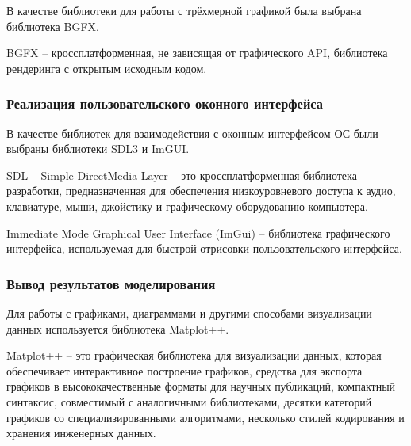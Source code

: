 В качестве библиотеки для работы с трёхмерной графикой была выбрана библиотека BGFX.

BGFX -- кроссплатформенная, не зависящая от графического API, библиотека рендеринга с открытым исходным кодом.

\subsubsection{\textbf{Реализация пользовательского оконного интерфейса}}

В качестве библиотек для взаимодействия с оконным интерфейсом ОС были выбраны библиотеки SDL3 и ImGUI.

SDL -- Simple DirectMedia Layer -- это кроссплатформенная библиотека разработки, предназначенная для обеспечения низкоуровневого доступа к аудио, клавиатуре, мыши, джойстику и графическому оборудованию компьютера.

Immediate Mode Graphical User Interface (ImGui) -- библиотека графического интерфейса, используемая для быстрой отрисовки пользовательского интерфейса.

\subsubsection{\textbf{Вывод результатов моделирования}}

Для работы с графиками, диаграммами и другими способами визуализации данных используется библиотека Matplot++.

Matplot++ -- это графическая библиотека для визуализации данных, которая обеспечивает интерактивное построение графиков, средства для экспорта графиков в высококачественные форматы для научных публикаций, компактный синтаксис, совместимый с аналогичными библиотеками, десятки категорий графиков со специализированными алгоритмами, несколько стилей кодирования и хранения инженерных данных.